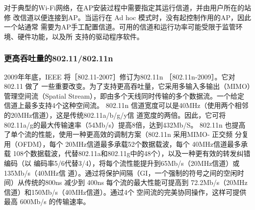 对于典型的Wi-Fi网络，在AP安装过程中需要指定其运行信道，并由用户所在的站修
改信道以便连接到AP。当运行在 Ad hoc 模式时，没有起控制作用的AP，因此一个站通常
需要为AP手工配置信道。可用的信道和运行功率可能受限于监管环境、硬件功能，以及所
支持的驱动程序软件。

\subsubsection{更高吞吐量的802.11/802.11n}

2009年年底，IEEE 将［802.11-2007］修订为802.11n ［802.11n-2009］。它对802.11 做了
一些重要改变。为了支持更高吞吐量，它采用多输入多输出（MIMO）管理空间流（Spatial
Stream），即由多个天线同时传输的多个数据流。一个给定信道上最多支持4个这种空间流。
802.11n 信道宽度可以是40MHz（使用两个相邻的20MHz信道），这是传统802.11a/b/g/y信
道宽度的两倍。因此，它可将 802.11a/g的最大传输速率（54Mb/s）提高8倍，达到432Mb/S。
802.11n 也提高了单个流的性能，使用一种更高效的调制方案（802.11n 采用MIMO- 正交频
分复用（OFDM），每个 20MHz信道最多承载52个数据载波，每个 40MHz信道最多承载
108个数据载波，代替802.11a和802.11g中的48个），以及一种更有效的转发纠错编码（以
编码率5/6代替3/4），将每个流性能提升到65Mb/s（20MHz信道）或135Mb/s（40MHz信
道）。通过将保护间隔（GI，一个强制的符号之间的空闲时间）从传统的800ns 减少到 400ns
每个流的最大性能可提高到 72.2Mb/s（20MHz信道）和150Mb/s（40MHz信道）。通过4个
空间流的完美协同操作，这样可提供最高 600Mb/s 的传输速率。

